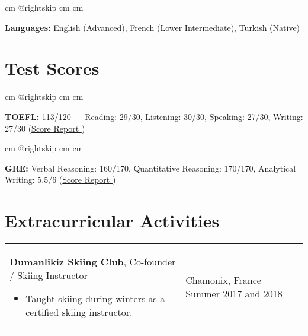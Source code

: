 \documentclass[10pt, a4paper]{article}
\newenvironment{highlights}{
        \begin{itemize}[
                topsep=0pt,
                parsep=0.07 cm,
                partopsep=0pt,
                itemsep=0pt,
                after=\vspace*{-1\baselineskip},
                leftmargin=0.6 cm + 3pt
            ]
    }{
        \end{itemize}
    } %
\let\hrefWithoutArrow\href
\renewcommand{\href}[2]{\hrefWithoutArrow{#1}{#2 \raisebox{.15ex}{\footnotesize \faExternalLink*}}}
\begin{document}
            \par\endgroup

        \vspace*{0.12 cm}
        
            \begingroup\raggedright
             cm
            \advance\csname @rightskip cm
            \advance{} cm

            \textbf{Languages:} English (Advanced), French (Lower Intermediate), Turkish (Native)

            \par\endgroup



    \section{Test Scores}
    
            \begingroup\raggedright
             cm
            \advance\csname @rightskip cm
            \advance{} cm

            \textbf{TOEFL:} 113/120 — Reading: 29/30, Listening: 30/30, Speaking: 27/30, Writing: 27/30 (\href{https://example.com/}{Score Report})

            \par\endgroup

        \vspace*{0.12 cm}
        
            \begingroup\raggedright
             cm
            \advance\csname @rightskip cm
            \advance{} cm

            \textbf{GRE:} Verbal Reasoning: 160/170, Quantitative Reasoning: 170/170, Analytical Writing: 5.5/6 (\href{https://example.com/}{Score Report})

            \par\endgroup



    \section{Extracurricular Activities}
    
        \begin{tabularx}{ cm-0.13cm}{K{0.2 cm} R{3.6 cm}}
            \textbf{Dumanlikiz Skiing Club}, Co-founder / Skiing Instructor
            \vspace*{0.12 cm}
            \begin{highlights}
                \item Taught skiing during winters as a certified skiing instructor. \hspace*{-0.2cm}
            \end{highlights}
        &
            Chamonix, France \newline
            Summer 2017 and 2018
        \end{tabularx}
\end{document}
